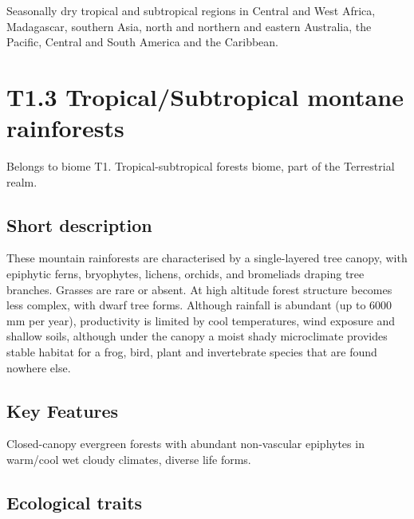 \documentclass[
  letterpaper,
  DIV=11,
  numbers=noendperiod]{scrartcl}
\begin{document}
Seasonally dry tropical and subtropical regions in Central and West
Africa, Madagascar, southern Asia, north and northern and eastern
Australia, the Pacific, Central and South America and the Caribbean.

\section{T1.3 Tropical/Subtropical montane
rainforests}\label{t1.3-tropicalsubtropical-montane-rainforests}

Belongs to biome T1. Tropical-subtropical forests biome, part of the
Terrestrial realm.

\subsection{Short description}\label{short-description-71}

These mountain rainforests are characterised by a single-layered tree
canopy, with epiphytic ferns, bryophytes, lichens, orchids, and
bromeliads draping tree branches. Grasses are rare or absent. At high
altitude forest structure becomes less complex, with dwarf tree forms.
Although rainfall is abundant (up to 6000 mm per year), productivity is
limited by cool temperatures, wind exposure and shallow soils, although
under the canopy a moist shady microclimate provides stable habitat for
a frog, bird, plant and invertebrate species that are found nowhere
else.

\subsection{Key Features}\label{key-features-71}

Closed-canopy evergreen forests with abundant non-vascular epiphytes in
warm/cool wet cloudy climates, diverse life forms.

\subsection{Ecological traits}\label{ecological-traits-71}
\end{document}

